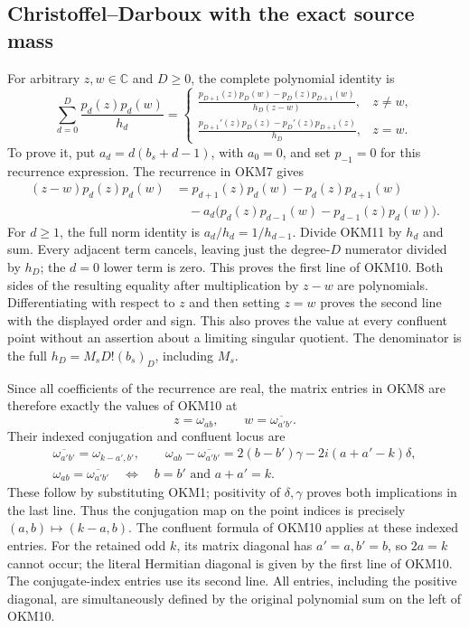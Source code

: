 \documentclass[11pt,a4paper]{article}
\begin{document}
\subsection{Christoffel--Darboux with the exact source mass}
For arbitrary $z,w\in\mathbb C$ and $D\geq0$, the complete
polynomial identity is
\[
 \sum_{d=0}^D\frac{p_d(z)p_d(w)}{h_d}
 =\begin{cases}
 \displaystyle\frac{p_{D+1}(z)p_D(w)-p_D(z)p_{D+1}(w)}
                     {h_D(z-w)},&z\ne w,\\[6pt]
 \displaystyle\frac{p_{D+1}'(z)p_D(z)-p_D'(z)p_{D+1}(z)}{h_D},
                       &z=w.
 \end{cases}\tag{OKM10}
\]
To prove it, put $a_d=d(b_s+d-1)$, with $a_0=0$, and set
$p_{-1}=0$ for this recurrence expression. The recurrence
in OKM7 gives
\[
 \begin{split}
 (z-w)p_d(z)p_d(w)
 &=p_{d+1}(z)p_d(w)-p_d(z)p_{d+1}(w)\\
 &\quad-a_d\bigl(p_d(z)p_{d-1}(w)-p_{d-1}(z)p_d(w)\bigr).
 \end{split}\tag{OKM11}
\]
For $d\geq1$, the full norm identity is $a_d/h_d=1/h_{d-1}$.
Divide OKM11 by $h_d$ and sum. Every adjacent term cancels,
leaving just the degree-$D$ numerator divided by $h_D$; the
$d=0$ lower term is zero. This proves the first line of OKM10.
Both sides of the resulting equality after multiplication by
$z-w$ are polynomials. Differentiating with respect to $z$ and
then setting $z=w$ proves the second line with the displayed
order and sign. This also proves the value at every confluent
point without an assertion about a limiting singular quotient.
The denominator is the full $h_D=M_sD!(b_s)_D$, including $M_s$.

Since all coefficients of the recurrence are real, the matrix
entries in OKM8 are therefore exactly the values of OKM10 at
\[
 z=\omega_{ab},\qquad w=\overline{\omega_{a'b'}}.
 \tag{OKM12}
\]
Their indexed conjugation and confluent locus are
\[
 \begin{gathered}
 \overline{\omega_{a'b'}}=\omega_{k-a',b'},\qquad
 \omega_{ab}-\overline{\omega_{a'b'}}
       =2(b-b')\gamma-2i(a+a'-k)\delta,\\
 \omega_{ab}=\overline{\omega_{a'b'}}
       \quad\Longleftrightarrow\quad b=b'\text{ and }a+a'=k.
 \end{gathered}\tag{OKM13}
\]
These follow by substituting OKM1; positivity of $\delta,\gamma$
proves both implications in the last line. Thus the conjugation
map on the point indices is precisely $(a,b)\mapsto(k-a,b)$.
The confluent formula of OKM10 applies at these indexed entries.
For the retained odd $k$, its matrix diagonal has $a'=a,b'=b$,
so $2a=k$ cannot occur; the literal Hermitian diagonal is given
by the first line of OKM10. The conjugate-index entries use its
second line. All entries, including the positive diagonal, are
simultaneously defined by the original polynomial sum on the
left of OKM10.
\end{document}
